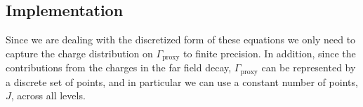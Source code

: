 \documentclass{sfuthesis}
\begin{document}

\subsection{Implementation}
\label{sec: 2DProxyImplementation}
Since we are dealing with the discretized form of these equations we only need to capture the charge distribution on $\Gamma_{\text{proxy}}$ to finite precision. In addition, since the contributions from the charges in the far field decay, $\Gamma_{\text{proxy}}$ can be represented by a discrete set of points, and in particular we can use a constant number of points, $J$, across all levels.
\end{document}
